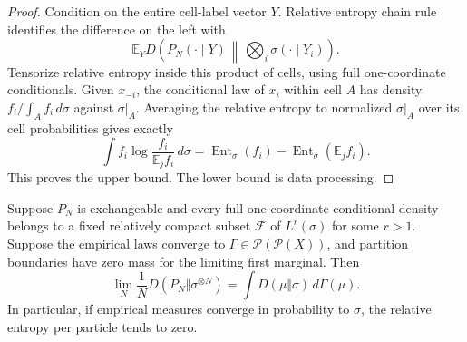 \begin{proof}
Condition on the entire cell-label vector $Y$. Relative entropy chain
rule identifies the difference on the left with
\[
 \mathbb E_Y D\left(P_N(\cdot\mid Y)\,
       \middle\Vert\,\bigotimes_i\sigma(\cdot\mid Y_i)\right).
\]
Tensorize relative entropy inside this product of cells, using full
one-coordinate conditionals. Given $x_{-i}$, the conditional law of
$x_i$ within cell $A$ has density $f_i/\int_Af_i\,d\sigma$ against
$\sigma|_A$. Averaging the relative entropy to normalized $\sigma|_A$
over its cell probabilities gives exactly
\[
 \int f_i\log\frac{f_i}{\mathbb E_j f_i}\,d\sigma
 =\operatorname{Ent}_\sigma(f_i)-
                       \operatorname{Ent}_\sigma(\mathbb E_jf_i).
\]
This proves the upper bound. The lower bound is data processing.
\end{proof}

\begin{lemma}
\label{att:entropy-chaos}
Suppose $P_N$ is exchangeable and every full one-coordinate conditional
density belongs to a fixed relatively compact subset $\mathcal F$ of
$L^r(\sigma)$ for some $r>1$. Suppose the empirical laws converge to
$\Gamma\in\mathcal P(\mathcal P(X))$, and partition boundaries have
zero mass for the limiting first marginal. Then
\[
 \lim_N\frac1N D(P_N\Vert\sigma^{\otimes N})
 =\int D(\mu\Vert\sigma)\,d\Gamma(\mu).
\]
In particular, if empirical measures converge in probability to
$\sigma$, the relative entropy per particle tends to zero.
\end{lemma}

